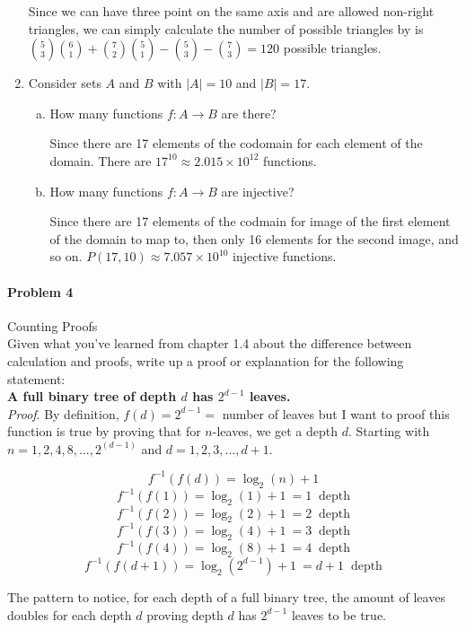 \documentclass[11pt, a4paper]{article}
\newcommand\setItemNumber[1]{\setcounter{enumi}{\numexpr#1-1\relax}}
\begin{document}
\begin{enumerate}
            Since we can have three point on the same axis and are allowed non-right triangles, we can simply calculate the number of possible triangles by is ${5\choose 3}{6\choose 1}+{7\choose 2}{5\choose 1}-{5\choose 3}-{7\choose 3} = 120$ possible triangles.

        \setItemNumber{12}
        \item Consider sets $A$ and $B$ with $|A| = 10$ and $|B| = 17$.
            \begin{enumerate}[(a)]
                \item How many functions $f: A\rightarrow B$ are there?

                    Since there are 17 elements of the codomain for each element of the domain. There are $17^{10} \approx 2.015 \times 10^{12}$ functions.

                \item How many functions $f: A\rightarrow B$ are injective?

                    Since there are 17 elements of the codmain for image of the first element of the domain to map to, then only 16 elements for the second image, and so on. $P(17, 10) \approx 7.057 \times 10^{10}$ injective functions. 

            \end{enumerate}

    \end{enumerate}

	\paragraph{Problem 4} Counting Proofs\\

	Given what you've learned from chapter 1.4 about the difference between calculation and proofs, write up a proof or explanation for the following statement:\\

	\textbf{A full binary tree of depth $d$ has $2^{d-1}$ leaves.} \\

    \textit{Proof}. By definition, $f(d) = 2^{d-1} =$ number of leaves but I want to proof this function is true by proving that for $n$-leaves, we get a depth $d$. Starting with $n = 1, 2, 4, 8, ..., 2^{(d - 1)}$ and $d = 1, 2, 3,..., d+1$.

    $$f^{-1}(f(d)) = \log_2{(n)} + 1$$ 
    $$f^{-1}(f(1)) = \log_2{(1)} + 1\ = 1\;\; \text{depth}$$
    $$f^{-1}(f(2)) = \log_2{(2)} + 1\ = 2\;\; \text{depth}$$
    $$f^{-1}(f(3)) = \log_2{(4)} + 1\ = 3\;\; \text{depth}$$
    $$f^{-1}(f(4)) = \log_2{(8)} + 1\ = 4\;\; \text{depth}$$
    $$f^{-1}(f(d+1)) = \log_2{(2^{d-1})} + 1\ = d+1\;\; \text{depth}$$

    \center The pattern to notice, for each depth of a full binary tree, the amount of leaves doubles for each depth $d$ proving depth $d$ has $2^{d-1}$ leaves to be true.
\end{document}
